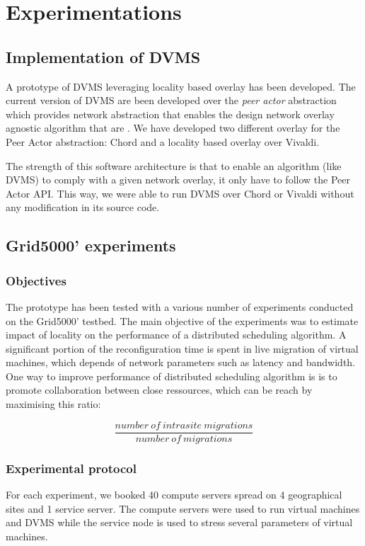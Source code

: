 \section{Experimentations}

\subsection{Implementation of DVMS}

A prototype of DVMS leveraging locality based overlay has been developed. The 
current version of DVMS are been developed over the \emph{peer actor} 
abstraction which provides network abstraction that enables the design network 
overlay agnostic algorithm that are . We have developed two different
overlay for the Peer Actor abstraction: Chord and a locality based overlay over
Vivaldi.

The strength of this software architecture is that to enable an algorithm (like
DVMS) to comply with a given network overlay, it only have to follow the Peer 
Actor API. This way, we were able to run DVMS over Chord or Vivaldi without any
modification in its source code.

\subsection{Grid5000' experiments}


\subsubsection{Objectives}
The prototype has been tested with a various number of experiments conducted on
the Grid5000' testbed. The main objective of the experiments was to estimate
impact of locality on the performance of a distributed scheduling algorithm. 
A significant portion of the reconfiguration time is spent in live migration of
virtual machines, which depends of network parameters such as latency and
bandwidth. One way to improve performance of distributed scheduling algorithm is
is to promote collaboration between close ressources, which can be reach by 
maximising this ratio:

\[
	\frac{number\ of\ intrasite\ migrations}{number\ of\ migrations}
\]

\subsubsection{Experimental protocol}
For each experiment, we booked 40 compute servers spread on 4 geographical sites
and 1 service server. The compute servers were used to run virtual machines and
DVMS while the service node is used to stress several parameters of 
virtual machines.

